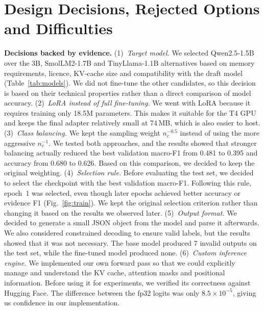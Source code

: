 \documentclass[conference]{IEEEtran}
\begin{document}
\section{Design Decisions, Rejected Options and Difficulties}
\textbf{Decisions backed by evidence.}
(1)~\emph{Target model.} We selected Qwen2.5-1.5B over the 3B, SmolLM2-1.7B and TinyLlama-1.1B alternatives based on memory requirements, licence, KV-cache size and compatibility with the draft model (Table~\ref{tab:models}). We did not fine-tune the other candidates, so this decision is based on their technical properties rather than a direct comparison of model accuracy.
(2)~\emph{LoRA instead of full fine-tuning.} We went with LoRA because it requires training only 18.5M parameters. This makes it suitable for the T4 GPU and keeps the final adapter relatively small at 74\,MB, which is also easier to host.
(3)~\emph{Class balancing.} We kept the sampling weight $n_c^{-0.5}$ instead of using the more aggressive $n_c^{-1}$. We tested both approaches, and the results showed that stronger balancing actually reduced the best validation macro-F1 from 0.481 to 0.395 and accuracy from 0.680 to 0.626. Based on this comparison, we decided to keep the original weighting.
(4)~\emph{Selection rule.} Before evaluating the test set, we decided to select the checkpoint with the best validation macro-F1. Following this rule, epoch~1 was selected, even though later epochs achieved better accuracy or evidence F1 (Fig.~\ref{fig:train}). We kept the original selection criterion rather than changing it based on the results we observed later.
(5)~\emph{Output format.} We decided to generate a small JSON object from the model and parse it afterwards. We also considered constrained decoding to ensure valid labels, but the results showed that it was not necessary. The base model produced 7 invalid outputs on the test set, while the fine-tuned model produced none.
(6)~\emph{Custom inference engine.} We implemented our own forward pass so that we could explicitly manage and understand the KV cache, attention masks and positional information. Before using it for experiments, we verified its correctness against Hugging Face. The difference between the fp32 logits was only $8.5\times10^{-5}$, giving us confidence in our implementation.
\end{document}
